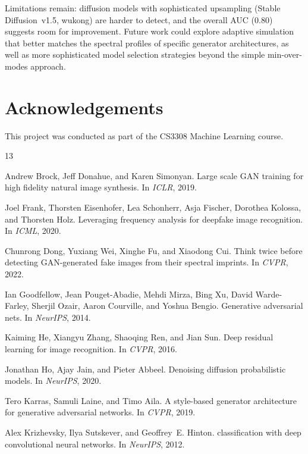 \documentclass[11pt,a4paper]{article}
\begin{document}
Limitations remain: diffusion models with sophisticated upsampling (Stable Diffusion~v1.5, wukong) are harder to detect, and the overall AUC (0.80) suggests room for improvement. Future work could explore adaptive simulation that better matches the spectral profiles of specific generator architectures, as well as more sophisticated model selection strategies beyond the simple min-over-modes approach.

\section*{Acknowledgements}

This project was conducted as part of the CS3308 Machine Learning course.


\begin{thebibliography}{13}

Andrew Brock, Jeff Donahue, and Karen Simonyan.
\newblock Large scale {GAN} training for high fidelity natural image synthesis.
\newblock In \emph{ICLR}, 2019.

Joel Frank, Thorsten Eisenhofer, Lea Schonherr, Asja Fischer, Dorothea Kolossa, and Thorsten Holz.
\newblock Leveraging frequency analysis for deepfake image recognition.
\newblock In \emph{ICML}, 2020.

Chunrong Dong, Yuxiang Wei, Xinghe Fu, and Xiaodong Cui.
\newblock Think twice before detecting {GAN}-generated fake images from their spectral imprints.
\newblock In \emph{CVPR}, 2022.

Ian Goodfellow, Jean Pouget-Abadie, Mehdi Mirza, Bing Xu, David Warde-Farley, Sherjil Ozair, Aaron Courville, and Yoshua Bengio.
\newblock Generative adversarial nets.
\newblock In \emph{NeurIPS}, 2014.

Kaiming He, Xiangyu Zhang, Shaoqing Ren, and Jian Sun.
\newblock Deep residual learning for image recognition.
\newblock In \emph{CVPR}, 2016.

Jonathan Ho, Ajay Jain, and Pieter Abbeel.
\newblock Denoising diffusion probabilistic models.
\newblock In \emph{NeurIPS}, 2020.

Tero Karras, Samuli Laine, and Timo Aila.
\newblock A style-based generator architecture for generative adversarial networks.
\newblock In \emph{CVPR}, 2019.

Alex Krizhevsky, Ilya Sutskever, and Geoffrey~E. Hinton.
 classification with deep convolutional neural networks.
\newblock In \emph{NeurIPS}, 2012.


\end{thebibliography}
\end{document}
